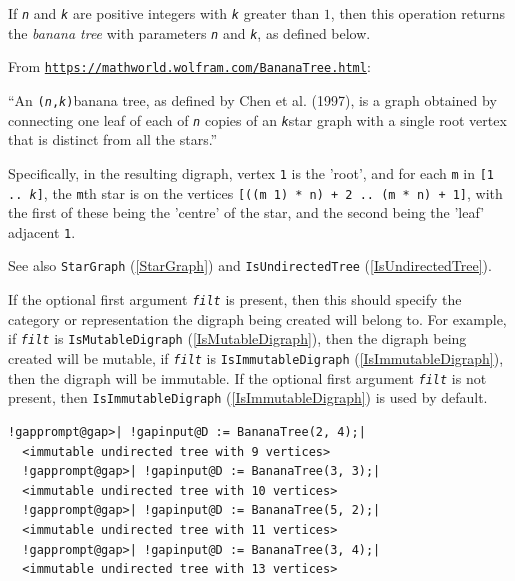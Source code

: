 \documentclass[a4paper,11pt]{report}
\begin{document}
{{{ If \mbox{\texttt{\mdseries\slshape n}} and \mbox{\texttt{\mdseries\slshape k}} are positive integers with \mbox{\texttt{\mdseries\slshape k}} greater than $1$, then this operation returns the \emph{banana tree} with parameters \mbox{\texttt{\mdseries\slshape n}} and \mbox{\texttt{\mdseries\slshape k}}, as defined below. 

 From \href{https://mathworld.wolfram.com/BananaTree.html} {\texttt{https://mathworld.wolfram.com/BananaTree.html}}: 

 ``An \texttt{(\mbox{\texttt{\mdseries\slshape n}},\mbox{\texttt{\mdseries\slshape k}})}\texttt{}banana tree, as defined by Chen et al. (1997), is a graph
obtained by connecting one leaf of each of \mbox{\texttt{\mdseries\slshape n}} copies of an \mbox{\texttt{\mdseries\slshape k}}\texttt{}star graph with a single root vertex that is distinct from
all the stars.'' 

 Specifically, in the resulting digraph, vertex \texttt{1} is the 'root', and for each \texttt{m} in \texttt{[1 .. \mbox{\texttt{\mdseries\slshape k}}]}, the \texttt{m}th star is on the vertices \texttt{[((m \texttt{} 1) * n) + 2 .. (m * n) + 1]}, with the first of these being the 'centre' of the star, and the second being
the 'leaf' adjacent \texttt{1}. 

 See also \texttt{StarGraph} (\ref{StarGraph}) and \texttt{IsUndirectedTree} (\ref{IsUndirectedTree}). 

 If the optional first argument \mbox{\texttt{\mdseries\slshape filt}} is present, then this should specify the category or representation the
digraph being created will belong to. For example, if \mbox{\texttt{\mdseries\slshape filt}} is \texttt{IsMutableDigraph} (\ref{IsMutableDigraph}), then the digraph being created will be mutable, if \mbox{\texttt{\mdseries\slshape filt}} is \texttt{IsImmutableDigraph} (\ref{IsImmutableDigraph}), then the digraph will be immutable. If the optional first argument \mbox{\texttt{\mdseries\slshape filt}} is not present, then \texttt{IsImmutableDigraph} (\ref{IsImmutableDigraph}) is used by default.

 
\begin{Verbatim}[commandchars=!@|,fontsize=\small,frame=single,label=Example]
  !gapprompt@gap>| !gapinput@D := BananaTree(2, 4);|
  <immutable undirected tree with 9 vertices>
  !gapprompt@gap>| !gapinput@D := BananaTree(3, 3);|
  <immutable undirected tree with 10 vertices>
  !gapprompt@gap>| !gapinput@D := BananaTree(5, 2);|
  <immutable undirected tree with 11 vertices>
  !gapprompt@gap>| !gapinput@D := BananaTree(3, 4);|
  <immutable undirected tree with 13 vertices>
\end{Verbatim}
 }

}}
\end{document}
